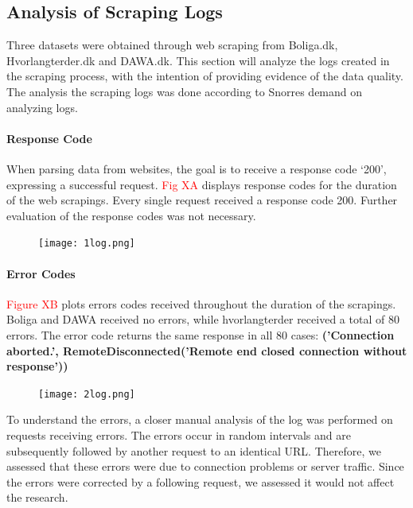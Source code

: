 \documentclass[12pt,a4paper]{article}
\begin{document}
\subsection{Analysis of Scraping Logs}
Three datasets were obtained through web scraping from Boliga.dk, Hvorlangterder.dk and DAWA.dk. This section will analyze the logs created in the scraping process, with the intention of providing evidence of the data quality. The analysis the scraping logs was done according to Snorres demand on analyzing logs. 
\paragraph{Response Code}
When parsing data from websites, the goal is to receive a response code ‘200’, expressing a successful request. \textcolor{red}{Fig XA} displays response codes for the duration of the web scrapings. Every single request received a response code 200. Further evaluation of the response codes was not necessary.
\begin{figure}[H]
  \centering
   \caption{}
   \texttt{[image: 1log.png]} 
  \label{fig:}
\end{figure}

\paragraph{Error Codes}
\textcolor{red}{Figure XB} plots errors codes received throughout the duration of the scrapings. Boliga and DAWA received no errors, while hvorlangterder received a total of 80 errors. The error code returns the same response in all 80 cases: \small{\textbf{('Connection aborted.', RemoteDisconnected('Remote end closed connection without response'))}}
\begin{figure}[H]
  \centering
   \caption{}
   \texttt{[image: 2log.png]} 
  \label{fig:}
\end{figure}
To understand the errors, a closer manual analysis of the log was performed on requests receiving errors. The errors occur in random intervals and are subsequently followed by another request to an identical URL. Therefore, we assessed that these errors were due to connection problems or server traffic. Since the errors were corrected by a following request, we assessed it would not affect the research.
\end{document}
